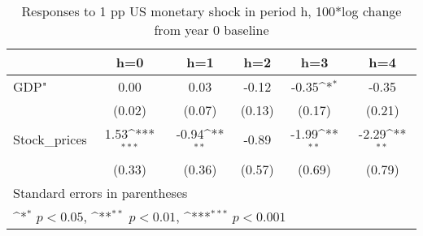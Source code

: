 \begin{table}[htbp]\centering
\def\sym#1{\ifmmode^{#1}\else\(^{#1}\)\fi}
\caption{Responses to 1 pp US monetary shock in period h, 100*log change from year 0 baseline}
\begin{tabular}{l*{5}{c}}
\hline\hline
            &\multicolumn{1}{c}{h=0}&\multicolumn{1}{c}{h=1}&\multicolumn{1}{c}{h=2}&\multicolumn{1}{c}{h=3}&\multicolumn{1}{c}{h=4}\\
\hline
GDP"        &        0.00         &        0.03         &       -0.12         &       -0.35\sym{*}  &       -0.35         \\
            &      (0.02)         &      (0.07)         &      (0.13)         &      (0.17)         &      (0.21)         \\
[1em]
Stock\_prices&        1.53\sym{***}&       -0.94\sym{**} &       -0.89         &       -1.99\sym{**} &       -2.29\sym{**} \\
            &      (0.33)         &      (0.36)         &      (0.57)         &      (0.69)         &      (0.79)         \\
\hline\hline
\multicolumn{6}{l}{\footnotesize Standard errors in parentheses}\\
\multicolumn{6}{l}{\footnotesize \sym{*} \(p<0.05\), \sym{**} \(p<0.01\), \sym{***} \(p<0.001\)}\\
\end{tabular}
\end{table}
